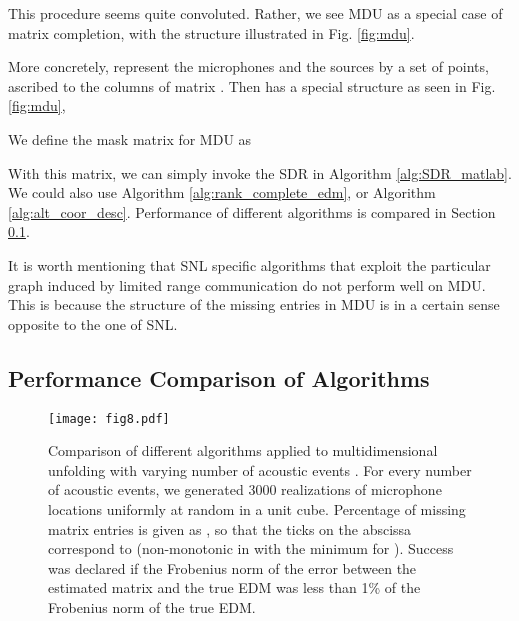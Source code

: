 \documentclass[10pt,double]{IEEEtran}
\newcommand{\rev}[1]{{#1}}
\begin{document}
This procedure seems quite convoluted. Rather, we see MDU as a special case of
matrix completion, with the structure illustrated in Fig.
\ref{fig:mdu}.

More concretely, represent the microphones and the sources by a set of  points, ascribed to the columns of matrix . Then
 has a special structure as seen in Fig. \ref{fig:mdu},


We define the mask matrix for MDU as

With this matrix, we can simply invoke the SDR in Algorithm
\ref{alg:SDR_matlab}. We could also use Algorithm
\ref{alg:rank_complete_edm}, or Algorithm \ref{alg:alt_coor_desc}. Performance
of different algorithms is compared in Section
\ref{sub:performance_comparison_of_algorithms}.


It is worth mentioning that SNL specific algorithms that exploit the
particular graph induced by limited range communication do not perform well on
MDU. This is because the structure of the missing entries in MDU is in a
certain sense opposite to the one of SNL. 





\subsection{Performance Comparison of Algorithms} \label{sub:performance_comparison_of_algorithms}



\begin{figure}[t!]
\centering
   \texttt{[image: fig8.pdf]}
   \caption{Comparison of different algorithms applied to multidimensional
   unfolding with varying number of acoustic events . For every number of
   acoustic events, we generated 3000 realizations of  microphone
   locations uniformly at random in a unit cube. \rev{Percentage of missing
   matrix entries is given as , so that the ticks on
   the abscissa correspond to  (non-monotonic in 
   with the minimum for ).} Success was declared if the Frobenius norm of
   the error between the estimated matrix and the true EDM was less than 1\%
   of the Frobenius norm of the true EDM.}
   \label{fig:success_mdu}
\end{figure}
\end{document}
